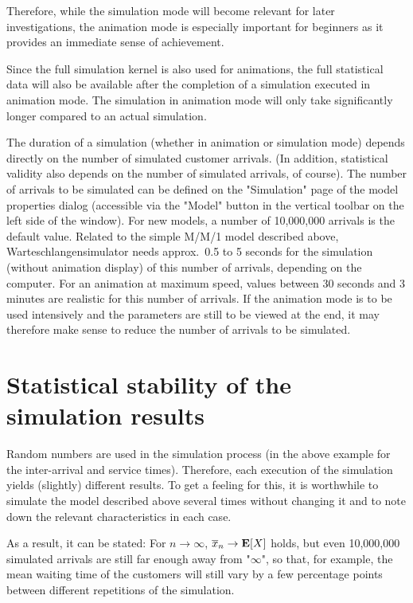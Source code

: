 \documentclass{svmono}
\begin{document}
Therefore, while the simulation mode will become relevant for later investigations, the animation mode is especially important for beginners as it provides an immediate sense of achievement.

Since the full simulation kernel is also used for animations, the full statistical data will also be available after the completion of a simulation executed in animation mode. The simulation in animation mode will only take significantly longer compared to an actual simulation.

The duration of a simulation (whether in animation or simulation mode) depends directly on the number of simulated customer arrivals. (In addition, statistical validity also depends on the number of simulated arrivals, of course). The number of arrivals to be simulated can be defined on the "Simulation" page of the model properties dialog (accessible via the "Model" button in the vertical toolbar on the left side of the window). For new models, a number of 10,000,000 arrivals is the default value. Related to the simple M/M/1 model described above, Warteschlangensimulator  needs approx.\ 0.5 to 5 seconds for the simulation (without animation display) of this number of arrivals, depending on the computer. For an animation at maximum speed, values between 30 seconds and 3 minutes are realistic for this number of arrivals. If the animation mode is to be used intensively and the parameters are still to be viewed at the end, it may therefore make sense to reduce the number of arrivals to be simulated.



\section{Statistical stability of the simulation results}

Random numbers are used in the simulation process (in the above example for the inter-arrival and service times). Therefore, each execution of the simulation yields (slightly) different results. To get a feeling for this, it is worthwhile to simulate the model described above several times without changing it and to note down the relevant characteristics in each case.

As a result, it can be stated: For $n\to\infty$, $\overline{x}_n\to{\bf E}[X]$ holds, but even 10,000,000 simulated arrivals are still far enough away from "$\infty$", so that, for example, the mean waiting time of the customers will still vary by a few percentage points between different repetitions of the simulation.
\end{document}
